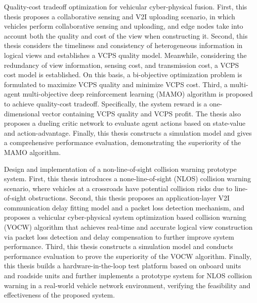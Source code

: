 \begin{eabstract}
 Quality-cost tradeoff optimization for vehicular cyber-physical fusion. First, this thesis proposes a collaborative sensing and V2I uploading scenario, in which vehicles perform collaborative sensing and uploading, and edge nodes take into account both the quality and cost of the view when constructing it. Second, this thesis considers the timeliness and consistency of heterogeneous information in logical views and establishes a VCPS quality model. Meanwhile, considering the redundancy of view information, sensing cost, and transmission cost, a VCPS cost model is established. On this basis, a bi-objective optimization problem is formulated to maximize VCPS quality and minimize VCPS cost. Third, a multi-agent multi-objective deep reinforcement learning (MAMO) algorithm is proposed to achieve quality-cost tradeoff. Specifically, the system reward is a one-dimensional vector containing VCPS quality and VCPS profit. The thesis also proposes a dueling critic network to evaluate agent actions based on state-value and action-advantage. Finally, this thesis constructs a simulation model and gives a comprehensive performance evaluation, demonstrating the superiority of the MAMO algorithm.

 Design and implementation of a non-line-of-sight collision warning prototype system. First, this thesis introduces a none-line-of-sight (NLOS) collision warning scenario, where vehicles at a crossroads have potential collision risks due to line-of-sight obstructions. Second, this thesis proposes an application-layer V2I communication delay fitting model and a packet loss detection mechanism, and proposes a vehicular cyber-physical system optimization based collision warning (VOCW) algorithm that achieves real-time and accurate logical view construction via packet loss detection and delay compensation to further improve system performance. Third, this thesis constructs a simulation model and conducts performance evaluation to prove the superiority of the VOCW algorithm. Finally, this thesis builds a hardware-in-the-loop test platform based on onboard units and roadside units and further implements a prototype system for NLOS collision warning in a real-world vehicle network environment, verifying the feasibility and effectiveness of the proposed system.
 
\end{eabstract}

